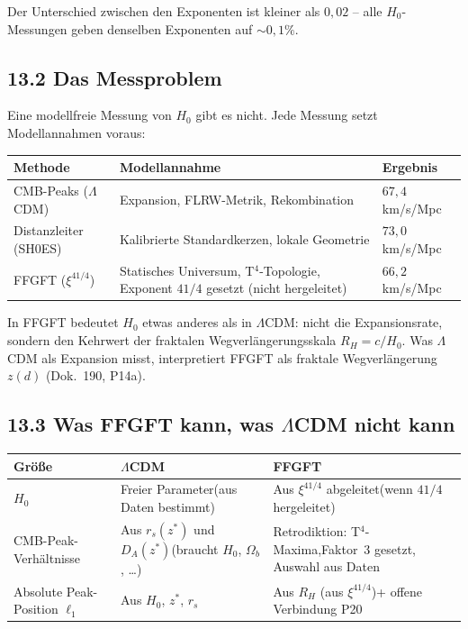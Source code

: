 Der Unterschied zwischen den Exponenten ist kleiner als $0{,}02$ --
alle $H_0$-Messungen geben denselben Exponenten auf $\sim 0{,}1\%$.

\subsection*{13.2 Das Messproblem}

Eine modellfreie Messung von $H_0$ gibt es nicht.
Jede Messung setzt Modellannahmen voraus:

\begin{center}
\begin{tabular}{p{3.5cm}p{5.5cm}p{3cm}}
\toprule
\textbf{Methode} & \textbf{Modellannahme} & \textbf{Ergebnis} \\
\midrule
CMB-Peaks ($\Lambda$CDM) &
  Expansion, FLRW-Metrik, Rekombination &
  $67{,}4$ km/s/Mpc \\
\addlinespace
Distanzleiter (SH0ES) &
  Kalibrierte Standardkerzen, lokale Geometrie &
  $73{,}0$ km/s/Mpc \\
\addlinespace
FFGFT ($\xi^{41/4}$) &
  Statisches Universum, T$^4$-Topologie,\newline
  Exponent $41/4$ gesetzt (nicht hergeleitet) &
  $66{,}2$ km/s/Mpc \\
\bottomrule
\end{tabular}
\end{center}

In FFGFT bedeutet $H_0$ etwas anderes als in $\Lambda$CDM:
nicht die Expansionsrate, sondern den Kehrwert der
fraktalen Wegverlängerungsskala $R_H = c/H_0$.
Was $\Lambda$CDM als Expansion misst, interpretiert FFGFT
als fraktale Wegverlängerung $z(d)$ (Dok.~190, P14a).

\subsection*{13.3 Was FFGFT kann, was $\Lambda$CDM nicht kann}

\begin{center}
\begin{tabular}{p{5cm}p{4.5cm}p{4.5cm}}
\toprule
\textbf{Größe} & \textbf{$\Lambda$CDM} & \textbf{FFGFT} \\
\midrule
$H_0$ &
  Freier Parameter\newline (aus Daten bestimmt) &
  Aus $\xi^{41/4}$ abgeleitet\newline (wenn $41/4$ hergeleitet) \\
\addlinespace
CMB-Peak-Verhältnisse &
  Aus $r_s(z^*)$ und $D_A(z^*)$\newline (braucht $H_0$, $\Omega_b$, \ldots) &
  Retrodiktion: T$^4$-Maxima,\newline Faktor~3 gesetzt, Auswahl aus Daten \\
\addlinespace
Absolute Peak-Position $\ell_1$ &
  Aus $H_0$, $z^*$, $r_s$ &
  Aus $R_H$ (aus $\xi^{41/4}$)\newline + offene Verbindung P20 \\
\bottomrule
\end{tabular}
\end{center}

